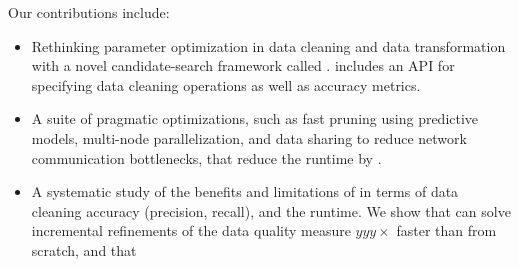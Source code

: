 \noindent Our contributions include:
\begin{itemize}[leftmargin=*, topsep=0mm, itemsep=0mm]
  \item Rethinking parameter optimization in data cleaning and data transformation with a novel candidate-search framework called \sys. \sys includes an API for specifying data cleaning operations as well as accuracy metrics.
  \item A suite of pragmatic optimizations, such as fast pruning using predictive models, multi-node parallelization, and data sharing to reduce network communication bottlenecks, that reduce the runtime by .
  \item A systematic study of the benefits and limitations of \sys in terms of data cleaning accuracy (precision, recall), and the runtime.  We show that \sys can solve incremental refinements of the data quality measure $yyy\times$ faster than from scratch, and that 
\end{itemize}


